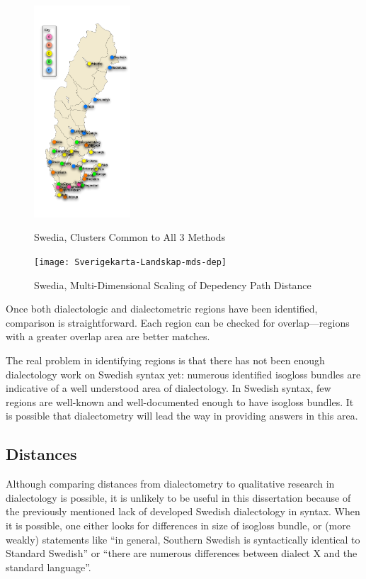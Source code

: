 \begin{figure}
  \includegraphics[width=0.32\textwidth]{Sverigekarta-Landskap-Swedia}
  \label{agree-clusters-small}
  \caption{Swedia, Clusters Common to All 3 Methods}
\end{figure}

\begin{figure}
  \texttt{[image: Sverigekarta-Landskap-mds-dep]}
  \label{mds-dep-small}
  \caption{Swedia, Multi-Dimensional Scaling of Depedency Path Distance}
\end{figure}

Once both dialectologic and dialectometric regions have been
identified, comparison is straightforward. Each region can be checked
for overlap---regions with a greater overlap area are better matches.

The real problem in identifying regions is that there has not been
enough dialectology work on Swedish syntax yet: numerous identified
isogloss bundles are indicative of a well understood area of
dialectology. In Swedish syntax, few regions are well-known and
well-documented enough to have isogloss bundles. It is possible that
dialectometry will lead the way in providing answers in this
area.

\subsection{Distances}

Although comparing distances from dialectometry to qualitative
research in dialectology is possible, it is unlikely to be useful in
this dissertation because of the previously mentioned lack of
developed Swedish dialectology in syntax. When it is possible,
one either looks for differences in size of isogloss bundle, or (more
weakly) statements like ``in general, Southern
Swedish is syntactically identical to Standard Swedish''
\cite{rosenkvist07} or ``there are numerous differences between
dialect X and the standard language''.

